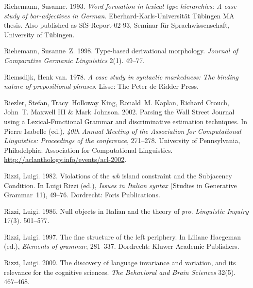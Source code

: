 \begin{thebibliography}{1420}
Riehemann, Susanne. 1993.
\newblock \emph{Word formation in lexical type hierarchies: {A} case study of
  \emph{bar}-adjectives in {German}}.
\newblock Eberhard-Karls-Uni\-ver\-si\-t{\"a}t T{\"u}bingen MA thesis.
\newblock Also published as SfS-Report-02-93, Seminar f{\"u}r
  Sprachwissenschaft, University of T{\"u}bingen.

Riehemann, Susanne~Z. 1998.
\newblock Type-based derivational morphology.
\newblock \emph{Journal of Comparative Germanic Linguistics} 2(1). 49--77.

Riemsdijk, {Henk van}. 1978.
\newblock \emph{A case study in syntactic markedness: {The} binding nature of
  prepositional phrases}.
\newblock Lisse: The Peter de Ridder Press.

Riezler, Stefan, Tracy~Holloway King, Ronald~M. Kaplan, Richard Crouch, John~T.
  {Maxwell III} \& Mark Johnson. 2002.
\newblock Parsing the {Wall Street Journal} using a {Lexical-Functional
  Grammar} and discriminative estimation techniques.
\newblock In Pierre Isabelle (ed.), \emph{{40th Annual Meeting of the
  Association for Computational Linguistics}: {Proceedings} of the conference},
  271--278. University of Pennsylvania, Philadelphia: Association for
  Computational Linguistics.
\newblock \urlprefix\url{http://aclanthology.info/events/acl-2002}.

Rizzi, Luigi. 1982.
\newblock Violations of the \emph{wh} island constraint and the {Subjacency
  Condition}.
\newblock In Luigi Rizzi (ed.), \emph{Issues in {Italian} syntax} (Studies in
  Generative Grammar~11), 49--76. Dordrecht: Foris Publications.

Rizzi, Luigi. 1986.
\newblock Null objects in {Italian} and the theory of \emph{pro}.
\newblock \emph{Linguistic Inquiry} 17(3). 501--577.

Rizzi, Luigi. 1997.
\newblock The fine structure of the left periphery.
\newblock In Liliane Haegeman (ed.), \emph{Elements of grammar}, 281--337.
  Dordrecht: Kluwer Academic Publishers.

Rizzi, Luigi. 2009{}.
\newblock The discovery of language invariance and variation, and its relevance
  for the cognitive sciences.
\newblock \emph{The Behavioral and Brain Sciences} 32(5). 467--468.


\end{thebibliography}
